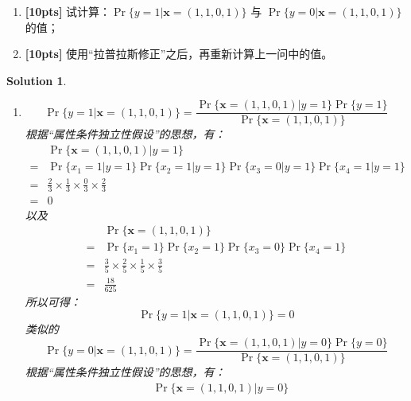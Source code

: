 \documentclass[a4paper,UTF8]{article}
\numberwithin{equation}{section}
\newtheorem*{mySol}{Solution}
\begin{document}
	\begin{enumerate}[ {(}1{)}]
		\item \textbf{[10pts]} 试计算：$\Pr\{ y=1 | \mathbf{x}=(1,1,0,1) \}$ 与 $\Pr\{ y=0 | \mathbf{x}=(1,1,0,1) \}$ 的值；
		\item \textbf{[10pts]} 使用“拉普拉斯修正”之后，再重新计算上一问中的值。
	\end{enumerate}
	
\begin{mySol}
	~\\
\begin{enumerate}[ {(}1{)}]
\item 
\begin{equation}
\Pr\{ y=1 | \mathbf{x}=(1,1,0,1) \} = \frac{\Pr\{\mathbf{x}=(1,1,0,1) | y=1  \} \Pr\{y=1\}}{\Pr\{\mathbf{x}=(1,1,0,1) \}}
\end{equation}
根据“属性条件独立性假设”的思想，有：
\begin{equation}
\begin{aligned}
&\Pr\{\mathbf{x}=(1,1,0,1) | y=1  \}\\ 
=& \Pr\{x_1 = 1 | y = 1\}\Pr\{x_2 = 1 | y = 1\}\Pr\{x_3 = 0 | y = 1\}\Pr\{x_4 = 1 | y = 1\}\\
=& \frac{2}{3}\times\frac{1}{3}\times\frac{0}{3}\times\frac{2}{3}\\
=& 0
\end{aligned}
\end{equation}
以及
\begin{equation}
\begin{aligned}
&\Pr\{\mathbf{x}=(1,1,0,1)\}\\ 
=& \Pr\{x_1 = 1\}\Pr\{x_2 = 1\}\Pr\{x_3 = 0\}\Pr\{x_4 = 1\}\\
=& \frac{3}{5}\times\frac{2}{5}\times\frac{1}{5}\times\frac{3}{5}\\
=& \frac{18}{625}
\end{aligned}
\end{equation}
所以可得：
\begin{equation}
\Pr\{ y=1 | \mathbf{x}=(1,1,0,1) \} = 0
\end{equation}
类似的
\begin{equation}
\Pr\{ y=0 | \mathbf{x}=(1,1,0,1) \} = \frac{\Pr\{\mathbf{x}=(1,1,0,1) | y=0  \} \Pr\{y=0\}}{\Pr\{\mathbf{x}=(1,1,0,1) \}}
\end{equation}
根据“属性条件独立性假设”的思想，有：
\begin{equation}
\begin{aligned}
&\Pr\{\mathbf{x}=(1,1,0,1) | y=0  \}\\ 

\end{aligned}
\end{equation}
\end{enumerate}
\end{mySol}
\end{document}
